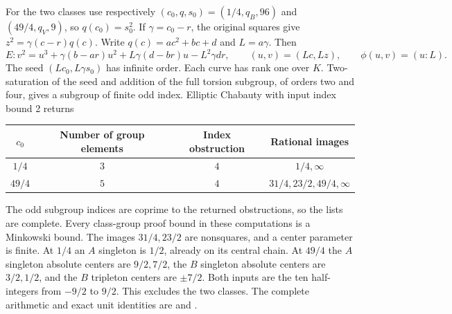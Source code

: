 For the two classes use respectively $(c_0,q,s_0)=(1/4,q_B,96)$ and
$(49/4,q_V,9)$, so $q(c_0)=s_0^2$. If $\gamma=c_0-r$, the original
squares give $z^2=\gamma(c-r)q(c)$. Write $q(c)=ac^2+bc+d$ and
$L=a\gamma$. Then
\[
 E:v^2=u^3+\gamma(b-ar)u^2+L\gamma(d-br)u-L^2\gamma dr,
 \qquad (u,v)=(Lc,Lz),\qquad\phi(u,v)=(u:L).
\]
The seed $(Lc_0,L\gamma s_0)$ has infinite order. Each curve has
rank one over $K$. Two-saturation of the seed and addition of the full
torsion subgroup, of orders two and four, gives a subgroup of finite
odd index. Elliptic Chabauty with input index bound 2 returns
\begin{center}
\begin{tabular}{cccc}
\toprule
$c_0$ & Number of group elements & Index obstruction & Rational images\\
\midrule
$1/4$ & $3$ & $4$ & $1/4,\infty$\\
$49/4$ & $5$ & $4$ & $31/4,23/2,49/4,\infty$\\
\bottomrule
\end{tabular}
\end{center}
The odd subgroup indices are coprime to the returned obstructions, so the
lists are complete. Every class-group proof bound in these computations
is a Minkowski bound. The images $31/4,23/2$ are nonsquares, and a
center parameter is finite. At $1/4$ an $A$ singleton is $1/2$,
already on its central chain. At $49/4$ the $A$ singleton absolute
centers are $9/2,7/2$, the $B$ singleton absolute centers are $3/2,1/2$,
and the $B$ tripleton centers are $\pm7/2$. Both inputs are the ten
half-integers from $-9/2$ to $9/2$. This excludes the two classes.
The complete arithmetic and exact unit identities are
 and
.

